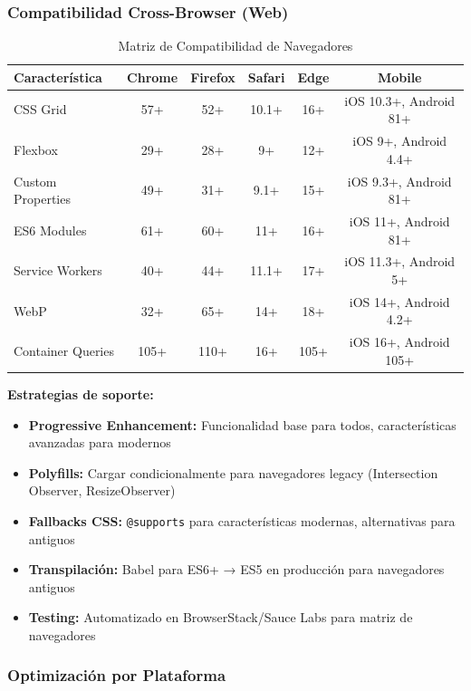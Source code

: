 \documentclass[12pt,a4paper,oneside]{article}
\begin{document}
\subsubsection{Compatibilidad Cross-Browser (Web)}

\begin{table}[h]
\centering
\caption{Matriz de Compatibilidad de Navegadores}
\label{tab:browser-compatibility}
\small
\begin{tabular}{|l|c|c|c|c|c|}
\hline
\textbf{Característica} & \textbf{Chrome} & \textbf{Firefox} & \textbf{Safari} & \textbf{Edge} & \textbf{Mobile} \\
\hline
CSS Grid & 57+ & 52+ & 10.1+ & 16+ & iOS 10.3+, Android 81+ \\
\hline
Flexbox & 29+ & 28+ & 9+ & 12+ & iOS 9+, Android 4.4+ \\
\hline
Custom Properties & 49+ & 31+ & 9.1+ & 15+ & iOS 9.3+, Android 81+ \\
\hline
ES6 Modules & 61+ & 60+ & 11+ & 16+ & iOS 11+, Android 81+ \\
\hline
Service Workers & 40+ & 44+ & 11.1+ & 17+ & iOS 11.3+, Android 5+ \\
\hline
WebP & 32+ & 65+ & 14+ & 18+ & iOS 14+, Android 4.2+ \\
\hline
Container Queries & 105+ & 110+ & 16+ & 105+ & iOS 16+, Android 105+ \\
\hline
\end{tabular}
\end{table}

\textbf{Estrategias de soporte:}
\begin{itemize}
    \item \textbf{Progressive Enhancement:} Funcionalidad base para todos, características avanzadas para modernos
    \item \textbf{Polyfills:} Cargar condicionalmente para navegadores legacy (Intersection Observer, ResizeObserver)
    \item \textbf{Fallbacks CSS:} \texttt{@supports} para características modernas, alternativas para antiguos
    \item \textbf{Transpilación:} Babel para ES6+ → ES5 en producción para navegadores antiguos
    \item \textbf{Testing:} Automatizado en BrowserStack/Sauce Labs para matriz de navegadores
\end{itemize}


\subsubsection{Optimización por Plataforma}
\end{document}
